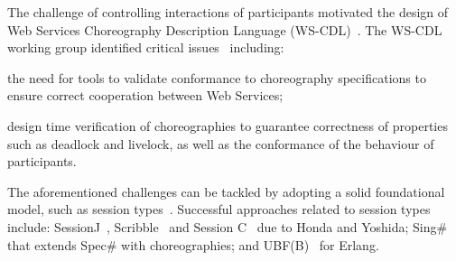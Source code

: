\documentclass[10pt]{llncs}
\begin{document}

The challenge of controlling interactions of participants motivated the design of Web Services Choreography Description Language (WS-CDL)~\cite{session-types-sessions}.
The WS-CDL working group identified critical issues~\cite{ws-critical-overview} including:
\begin{compactenum}
	\item the need for tools to validate conformance to choreography specifications to ensure correct cooperation between Web Services;
	\item design time verification of choreographies to guarantee correctness of properties such as deadlock and livelock, as well as the conformance of the behaviour of participants.
\end{compactenum}

The aforementioned challenges can be tackled by adopting a solid foundational model, such as session types~\cite{session-types-sessions,carbone2007structured}. Successful approaches related to session types include: %
 SessionJ~\cite{sj-lang}, Scribble~\cite{honda2011scribbling} and Session C~\cite{ng2012multiparty} due to Honda and Yoshida; Sing\#~\cite{basu2012deciding} that extends Spec\# with choreographies; and UBF(B)~\cite{armstrong2002getting} for Erlang.
\end{document}
